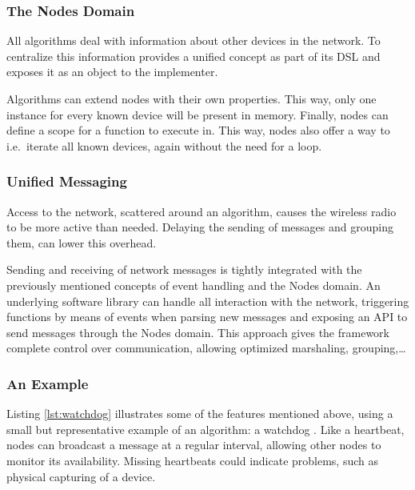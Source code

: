 \documentclass[conference]{IEEEtran}
\begin{document}
\subsubsection{The Nodes Domain}

All algorithms deal with information about other devices in the network. To
centralize this information \NAME provides a unified  concept as
part of its DSL and exposes it as an object to the implementer.

Algorithms can extend nodes with their own properties. This way, only one
instance for every known device will be present in memory. Finally, nodes can
define a scope for a function to execute in. This way, nodes also offer a way
to i.e.\ iterate all known devices, again without the need for a loop.

\subsubsection{Unified Messaging}
\label{dsl-unified-msg}

Access to the network, scattered around an algorithm, causes the wireless radio
to be more active than needed. Delaying the sending of messages and grouping
them, can lower this overhead.

Sending and receiving of network messages is tightly integrated with the
previously mentioned concepts of event handling and the Nodes domain. An
underlying software library can handle all interaction with the network,
triggering functions by means of events when parsing new messages and exposing
an API to send messages through the Nodes domain. This approach gives the
framework complete control over communication, allowing optimized marshaling,
grouping,\dots

\subsubsection{An Example}

Listing \ref{lst:watchdog} illustrates some of the features mentioned above,
using a small but representative example of an algorithm: a
watchdog \cite{mishra2004intrusion}. Like a heartbeat, nodes can broadcast a
message at a regular interval, allowing other nodes to monitor its
availability. Missing heartbeats could indicate problems, such as physical
capturing of a device.


\end{document}
